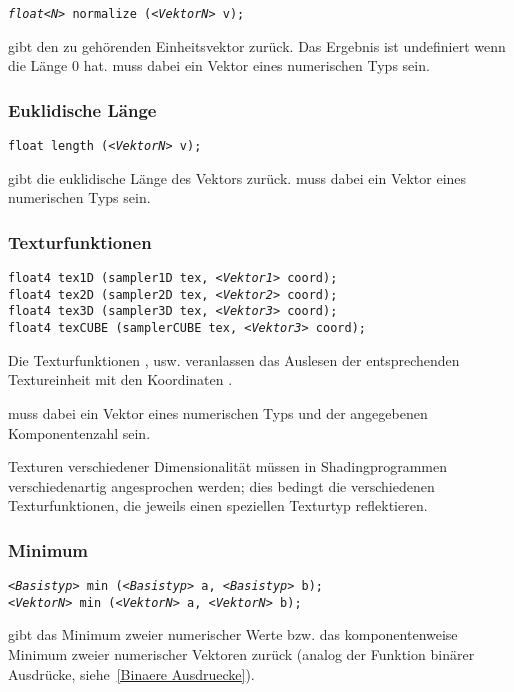 \texttt{\emph{float<N>} normalize (\emph{<VektorN>} v);}

 gibt den zu  gehörenden Einheitsvektor zurück.
Das Ergebnis ist undefiniert wenn  die Länge $0$ hat.
 muss dabei ein Vektor eines numerischen Typs sein.

\subsubsection{Euklidische Länge}

\texttt{float length (\emph{<VektorN>} v);}

 gibt die euklidische Länge des Vektors  zurück.
 muss dabei ein Vektor eines numerischen Typs sein.

\subsubsection{Texturfunktionen}
\label{Texturfunktionen}

\texttt{float4 tex1D (sampler1D tex, \emph{<Vektor1>} coord);}\\
\texttt{float4 tex2D (sampler2D tex, \emph{<Vektor2>} coord);}\\
\texttt{float4 tex3D (sampler3D tex, \emph{<Vektor3>} coord);}\\
\texttt{float4 texCUBE (samplerCUBE tex, \emph{<Vektor3>} coord);}

Die Texturfunktionen ,  usw. veranlassen das Auslesen der  entsprechenden
Textureinheit mit den Koordinaten .

 muss dabei ein Vektor eines numerischen Typs und der angegebenen
Komponentenzahl sein.

Texturen verschiedener
Dimensionalität müssen in Shadingprogrammen verschiedenartig angesprochen werden;
dies bedingt die verschiedenen Texturfunktionen, die jeweils einen speziellen Texturtyp
reflektieren.

\subsubsection{Minimum}

\texttt{\emph{<Basistyp>} min (\emph{<Basistyp>} a, \emph{<Basistyp>} b);}\\
\texttt{\emph{<VektorN>} min (\emph{<VektorN>} a, \emph{<VektorN>} b);}

 gibt das Minimum zweier numerischer Werte bzw. das komponentenweise
Minimum zweier numerischer Vektoren zurück (analog der Funktion binärer Ausdrücke,
siehe~\ref{Binaere Ausdruecke}).

